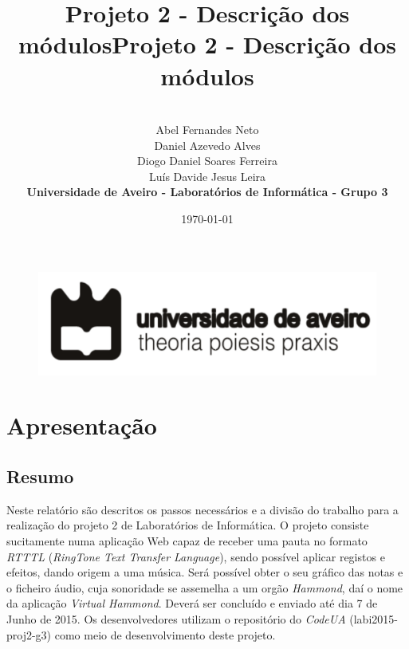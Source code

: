 \documentclass[11pt,openany,twoside]{report}
\title{\textbf{Projeto 2 - Descrição dos módulos}}
\begin{document}
\begin{titlepage}
\begin{figure}
\title{\textbf{Projeto 2 - Descrição dos módulos}}
\author{\\\vspace{0.3cm}
Abel Fernandes Neto
\\\vspace{0.3cm}
Daniel Azevedo Alves
\\\vspace{0.3cm}
Diogo Daniel Soares Ferreira
\\\vspace{0.3cm} 
Luís Davide Jesus Leira
\\\vspace{0.3cm}
\textbf{Universidade de Aveiro - Laboratórios de Informática - Grupo 3}}
\date{\today}
 \includegraphics[scale=1.5]{ua_logo.png}
\end{figure}
\end{titlepage}

\maketitle
\tableofcontents
\listoffigures

\part{Apresentação}

\chapter{Resumo}
Neste relatório são descritos os passos necessários e a divisão do trabalho para a realização do projeto 2 de Laboratórios de Informática. O projeto consiste sucitamente numa aplicação Web capaz de receber uma pauta no formato \textit{RTTTL} (\textit{RingTone Text Transfer Language}), sendo possível aplicar registos e efeitos, dando origem a uma música. Será possível obter o seu gráfico das notas e o ficheiro áudio, cuja sonoridade se assemelha a um orgão \textit{Hammond}, daí o nome da aplicação \textit{Virtual Hammond}. Deverá ser concluído e enviado até dia 7 de Junho de 2015. Os desenvolvedores utilizam o repositório do \textit{CodeUA} (labi2015-proj2-g3) como meio de desenvolvimento deste projeto.
\end{document}
